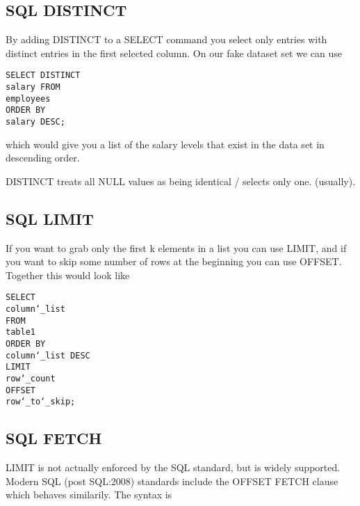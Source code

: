 \documentclass[10pt, english]{article}
\begin{document}
\subsection{SQL DISTINCT}
By adding DISTINCT to a SELECT command you select only 
entries with distinct entries in the first selected column.
On our fake dataset set we can use 

\texttt{SELECT DISTINCT\\
\hspace*{10pt}salary
FROM\\
\hspace*{10pt}employees \\
ORDER BY \\
\hspace*{10pt}salary DESC;
}

which would give you a list of the salary levels that exist in the
data set in descending order.

DISTINCT treats all NULL values as being identical / selects only one. (usually).

\subsection{SQL LIMIT}
If you want to grab only the first k elements in a list you can use LIMIT, and if you want to skip some number of rows 
at the beginning you can use OFFSET. Together this would look like 

\texttt{SELECT\\
\hspace*{10pt}column\char`_list\\
FROM\\
\hspace*{10pt}table1 \\
ORDER BY \\
\hspace*{10pt}column\char`_list DESC \\
LIMIT \\
\hspace*{10pt}row\char`_count \\
OFFSET \\
\hspace*{10pt}row\char`_to\char`_skip;
}

\subsection{SQL FETCH}
LIMIT is not actually enforced by the SQL standard, but is widely supported. Modern SQL (post SQL:2008) standards include
the OFFSET FETCH clause which behaves similarily. The syntax is 
\end{document}
